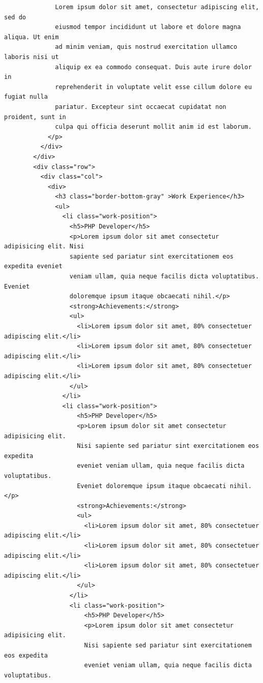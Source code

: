 \documentclass{article}
\begin{document}
\begin{verbatim}
              Lorem ipsum dolor sit amet, consectetur adipiscing elit, sed do
              eiusmod tempor incididunt ut labore et dolore magna aliqua. Ut enim
              ad minim veniam, quis nostrud exercitation ullamco laboris nisi ut
              aliquip ex ea commodo consequat. Duis aute irure dolor in
              reprehenderit in voluptate velit esse cillum dolore eu fugiat nulla
              pariatur. Excepteur sint occaecat cupidatat non proident, sunt in
              culpa qui officia deserunt mollit anim id est laborum.
            </p>
          </div>
        </div>
        <div class="row">
          <div class="col">
            <div>
              <h3 class="border-bottom-gray" >Work Experience</h3>
              <ul>
                <li class="work-position">
                  <h5>PHP Developer</h5>
                  <p>Lorem ipsum dolor sit amet consectetur adipisicing elit. Nisi
                  sapiente sed pariatur sint exercitationem eos expedita eveniet
                  veniam ullam, quia neque facilis dicta voluptatibus. Eveniet
                  doloremque ipsum itaque obcaecati nihil.</p>
                  <strong>Achievements:</strong>
                  <ul>
                    <li>Lorem ipsum dolor sit amet, 80% consectetuer adipiscing elit.</li>
                    <li>Lorem ipsum dolor sit amet, 80% consectetuer adipiscing elit.</li>
                    <li>Lorem ipsum dolor sit amet, 80% consectetuer adipiscing elit.</li>
                  </ul>
                </li>
                <li class="work-position">
                    <h5>PHP Developer</h5>
                    <p>Lorem ipsum dolor sit amet consectetur adipisicing elit.
                    Nisi sapiente sed pariatur sint exercitationem eos expedita
                    eveniet veniam ullam, quia neque facilis dicta voluptatibus.
                    Eveniet doloremque ipsum itaque obcaecati nihil.</p>
                    <strong>Achievements:</strong>
                    <ul>
                      <li>Lorem ipsum dolor sit amet, 80% consectetuer adipiscing elit.</li>
                      <li>Lorem ipsum dolor sit amet, 80% consectetuer adipiscing elit.</li>
                      <li>Lorem ipsum dolor sit amet, 80% consectetuer adipiscing elit.</li>
                    </ul>
                  </li>
                  <li class="work-position">
                      <h5>PHP Developer</h5>
                      <p>Lorem ipsum dolor sit amet consectetur adipisicing elit.
                      Nisi sapiente sed pariatur sint exercitationem eos expedita
                      eveniet veniam ullam, quia neque facilis dicta voluptatibus.

\end{verbatim}
\end{document}

